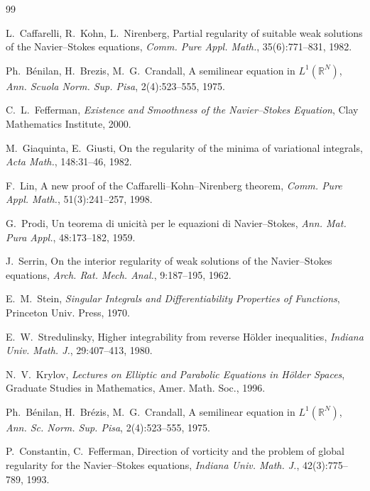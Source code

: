 \documentclass[11pt]{article}
\theoremstyle{definition}
\theoremstyle{remark}
\begin{document}
\begin{thebibliography}{99}

  L.~Caffarelli, R.~Kohn, L.~Nirenberg,
  Partial regularity of suitable weak solutions of the Navier--Stokes equations,
  \emph{Comm. Pure Appl. Math.}, 35(6):771--831, 1982.

  Ph.~Bénilan, H.~Brezis, M.~G.~Crandall,
  A semilinear equation in $L^1(\mathbb{R}^N)$,
  \emph{Ann. Scuola Norm. Sup. Pisa}, 2(4):523--555, 1975.

  C.~L.~Fefferman,
  \emph{Existence and Smoothness of the Navier--Stokes Equation},
  Clay Mathematics Institute, 2000.

  M.~Giaquinta, E.~Giusti,
  On the regularity of the minima of variational integrals,
  \emph{Acta Math.}, 148:31--46, 1982.

  F.~Lin,
  A new proof of the Caffarelli--Kohn--Nirenberg theorem,
  \emph{Comm. Pure Appl. Math.}, 51(3):241--257, 1998.

  G.~Prodi,
  Un teorema di unicità per le equazioni di Navier--Stokes,
  \emph{Ann. Mat. Pura Appl.}, 48:173--182, 1959.

  J.~Serrin,
  On the interior regularity of weak solutions of the Navier--Stokes equations,
  \emph{Arch. Rat. Mech. Anal.}, 9:187--195, 1962.

  E.~M.~Stein,
  \emph{Singular Integrals and Differentiability Properties of Functions},
  Princeton Univ. Press, 1970.

  E.~W.~Stredulinsky,
  Higher integrability from reverse H\"older inequalities,
  \emph{Indiana Univ. Math. J.}, 29:407--413, 1980.

  N.~V.~Krylov,
  \emph{Lectures on Elliptic and Parabolic Equations in H\"older Spaces},
  Graduate Studies in Mathematics, Amer. Math. Soc., 1996.

  Ph.~B\'enilan, H.~Br\'ezis, M.~G.~Crandall,
  A semilinear equation in $L^1(\mathbb{R}^N)$,
  \emph{Ann. Sc. Norm. Sup. Pisa}, 2(4):523--555, 1975.

  P.~Constantin, C.~Fefferman,
  Direction of vorticity and the problem of global regularity
  for the Navier--Stokes equations,
  \emph{Indiana Univ. Math. J.}, 42(3):775--789, 1993.


\end{thebibliography}
\end{document}

